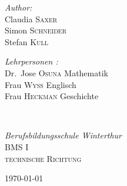 \begin{titlepage}
\begin{center}
 
\begin{minipage}{0.4\textwidth}
\begin{flushleft} \large
\emph{Author:}
\\Claudia \textsc{Saxer}
\\Simon \textsc{Schneider}
\\Stefan \textsc{Kull}
\end{flushleft}
\end{minipage}
\begin{minipage}{0.5\textwidth}
\begin{flushright} \large
\emph{Lehrpersonen :} 
\\Dr.~Jose \textsc{Osuna}  \textnormal{Mathematik}
\\Frau \textsc{Wyss} \textnormal{Englisch}
\\Frau \textsc{Heckman} \textnormal{Geschichte}
\end{flushright}
\end{minipage}
\\[0.6cm]
\begin{minipage}{0.5\textwidth}
\begin{center} \large
\emph{Berufsbildungsschule Winterthur} 
\\ \textsc{BMS I}
\\ \textsc{technische Richtung }
\end{center}
\end{minipage}

\vfill
{\large \today}

\end{center}


\end{titlepage}


